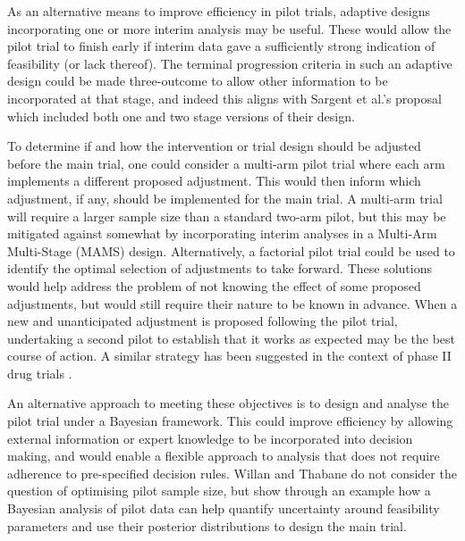\documentclass{bmcart}
\begin{document}
As an alternative means to improve efficiency in pilot trials, adaptive designs incorporating one or more interim analysis may be useful. These would allow the pilot trial to finish early if interim data gave a sufficiently strong indication of feasibility (or lack thereof). The terminal progression criteria in such an adaptive design could be made three-outcome to allow other information to be incorporated at that stage, and indeed this aligns with Sargent et al.'s \cite{Sargent2001} proposal which included both one and two stage versions of their design. 

To determine if and how the intervention or trial design should be adjusted before the main trial, one could consider a multi-arm pilot trial where each arm implements a different proposed adjustment. This would then inform which adjustment, if any, should be implemented for the main trial. A multi-arm trial will require a larger sample size than a standard two-arm pilot, but this may be mitigated against somewhat by incorporating interim analyses in a Multi-Arm Multi-Stage (MAMS) design. Alternatively, a factorial pilot trial could be used to identify the optimal selection of adjustments to take forward. These solutions would help address the problem of not knowing the effect of some proposed adjustments, but would still require their nature to be known in advance. When a new and unanticipated adjustment is proposed following the pilot trial, undertaking a second pilot to establish that it works as expected may be the best course of action. A similar strategy has been suggested in the context of phase II drug trials \cite{Brown2012}.

An alternative approach to meeting these objectives is to design and analyse the pilot trial under a Bayesian framework\cite{Hampson2017, Wilson2021}. This could improve efficiency by allowing external information or expert knowledge to be incorporated into decision making, and would enable a flexible approach to analysis that does not require adherence to pre-specified decision rules. Willan and Thabane \cite{Willan2020} do not consider the question of optimising pilot sample size, but show through an example how a Bayesian analysis of pilot data can help quantify uncertainty around feasibility parameters and use their posterior distributions to design the main trial. 

\end{document}
